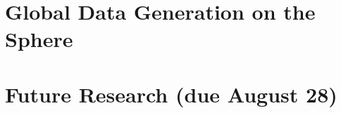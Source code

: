 \documentclass[phd]{uncgdissertation}
\begin{document}
\chapter{Global Data Generation on the Sphere}


\chapter{Future Research (due August 28)}







\backmatter %
\end{document}
